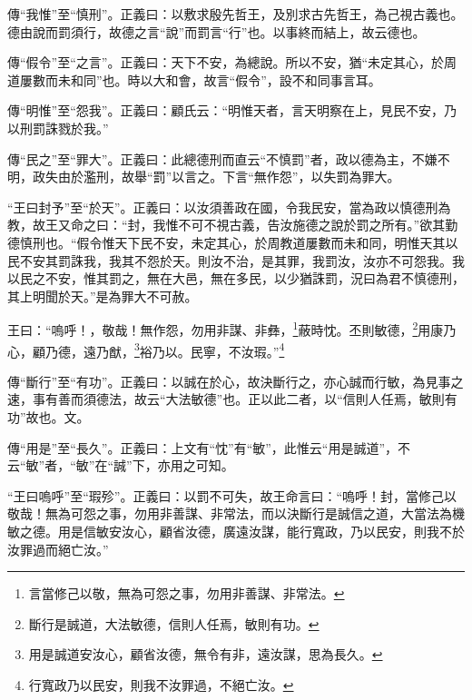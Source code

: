 {\noindent\zhuan{}\fzbyks 傳“我惟”至“慎刑”。正義曰：以敷求殷先哲王，及別求古先哲王，為己視古義也。德由說而罰須行，故德之言“說”而罰言“行”也。以事終而結上，故云德也。 \par}

{\noindent\zhuan{}\fzbyks 傳“假令”至“之言”。正義曰：天下不安，為總說。所以不安，猶“未定其心，於周道屢數而未和同”也。時以大和會，故言“假令”，設不和同事言耳。 \par}

{\noindent\zhuan{}\fzbyks 傳“明惟”至“怨我”。正義曰：顧氏云：“明惟天者，言天明察在上，見民不安，乃以刑罰誅戮於我。” \par}

{\noindent\zhuan{}\fzbyks 傳“民之”至“罪大”。正義曰：此總德刑而直云“不慎罰”者，政以德為主，不嫌不明，政失由於濫刑，故舉“罰”以言之。下言“無作怨”，以失罰為罪大。 \par}

{\noindent\shu{}\fzkt “王曰封予”至“於天”。正義曰：以汝須善政在國，令我民安，當為政以慎德刑為教，故王又命之曰：“封，我惟不可不視古義，告汝施德之說於罰之所有。”欲其勤德慎刑也。“假令惟天下民不安，未定其心，於周教道屢數而未和同，明惟天其以民不安其罰誅我，我其不怨於天。則汝不治，是其罪，我罰汝，汝亦不可怨我。我以民之不安，惟其罰之，無在大邑，無在多民，以少猶誅罰，況曰為君不慎德刑，其上明聞於天。”是為罪大不可赦。 \par}

王曰：“嗚呼！，敬哉！無作怨，勿用非謀、非彝，\footnote{言當修己以敬，無為可怨之事，勿用非善謀、非常法。}蔽時忱。丕則敏德，\footnote{斷行是誠道，大法敏德，信則人任焉，敏則有功。}用康乃心，顧乃德，遠乃猷，\footnote{用是誠道安汝心，顧省汝德，無令有非，遠汝謀，思為長久。}裕乃以。民寧，不汝瑕。”\footnote{行寬政乃以民安，則我不汝罪過，不絕亡汝。}


{\noindent\zhuan{}\fzbyks 傳“斷行”至“有功”。正義曰：以誠在於心，故決斷行之，亦心誠而行敏，為見事之速，事有善而須德法，故云“大法敏德”也。正以此二者，以“信則人任焉，敏則有功”故也。文。 \par}

{\noindent\zhuan{}\fzbyks 傳“用是”至“長久”。正義曰：上文有“忱”有“敏”，此惟云“用是誠道”，不云“敏”者，“敏”在“誠”下，亦用之可知。 \par}

{\noindent\shu{}\fzkt “王曰嗚呼”至“瑕殄”。正義曰：以罰不可失，故王命言曰：“嗚呼！封，當修己以敬哉！無為可怨之事，勿用非善謀、非常法，而以決斷行是誠信之道，大當法為機敏之德。用是信敏安汝心，顧省汝德，廣遠汝謀，能行寬政，乃以民安，則我不於汝罪過而絕亡汝。” \par}

